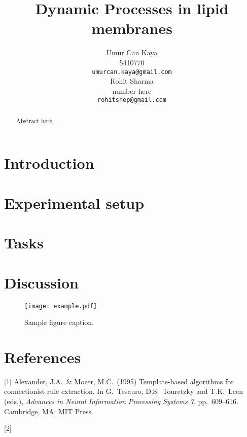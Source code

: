 \documentclass{article}
\title{Dynamic Processes in lipid membranes}
\author{
Umur Can Kaya\\
5410770\\
\texttt{umurcan.kaya@gmail.com}\\
\And
Rohit Sharma\\
number here\\
\texttt{rohitshep@gmail.com}\\
}
\begin{document}
\maketitle

\begin{abstract}

Abstract here.
\end{abstract}

\section{Introduction}


\section{Experimental setup}
\section{Tasks}
\section{Discussion}

\begin{figure}[h!]
\centering
\texttt{[image: example.pdf]}
\caption{Sample figure caption.}
\end{figure}


\section*{References}

[1] Alexander, J.A.\ \& Mozer, M.C.\ (1995) Template-based algorithms for
connectionist rule extraction. In G.\ Tesauro, D.S.\ Touretzky and T.K.\ Leen
(eds.), {\it Advances in Neural Information Processing Systems 7},
pp.\ 609--616. Cambridge, MA: MIT Press.

[2]
\end{document}
